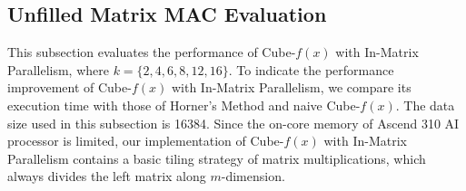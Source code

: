 \documentclass[12pt]{extbook}
\begin{document}
\begin{figure}[htbp]
\end{figure}

\subsection{Unfilled Matrix MAC Evaluation}

This subsection evaluates the performance of Cube-$f(x)$ with In-Matrix Parallelism, where $k = \{2, 4, 6, 8, 12, 16\}$. To indicate the performance improvement of Cube-$f(x)$ with In-Matrix Parallelism, we compare its execution time with those of Horner's Method and naive Cube-$f(x)$. The data size used in this subsection is 16384. Since the on-core memory of Ascend 310 AI processor is limited, our implementation of Cube-$f(x)$ with In-Matrix Parallelism contains a basic tiling strategy of matrix multiplications, which always divides the left matrix along $m$-dimension.
\end{document}
